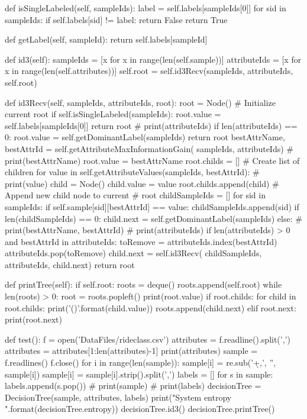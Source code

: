 \documentclass[%
oneside,                 %
final,                   %
10pt]{article}
\begin{document}
	def isSingleLabeled(self, sampleIds):
		label = self.labels[sampleIds[0]]
		for sid in sampleIds:
			if self.labels[sid] != label:
				return False
		return True

	def getLabel(self, sampleId):
		return self.labels[sampleId]

	def id3(self):
		sampleIds = [x for x in range(len(self.sample))]
		attributeIds = [x for x in range(len(self.attributes))]
		self.root = self.id3Recv(sampleIds, attributeIds, self.root)

	def id3Recv(self, sampleIds, attributeIds, root):
		root = Node() # Initialize current root
		if self.isSingleLabeled(sampleIds):
			root.value = self.labels[sampleIds[0]]
			return root
		# print(attributeIds)
		if len(attributeIds) == 0:
			root.value = self.getDominantLabel(sampleIds)
			return root
		bestAttrName, bestAttrId = self.getAttributeMaxInformationGain(
			sampleIds, attributeIds)
		# print(bestAttrName)
		root.value = bestAttrName
		root.childs = []  # Create list of children
		for value in self.getAttributeValues(sampleIds, bestAttrId):
			# print(value)
			child = Node()
			child.value = value
			root.childs.append(child)  # Append new child node to current
									   # root
			childSampleIds = []
			for sid in sampleIds:
				if self.sample[sid][bestAttrId] == value:
					childSampleIds.append(sid)
			if len(childSampleIds) == 0:
				child.next = self.getDominantLabel(sampleIds)
			else:
				# print(bestAttrName, bestAttrId)
				# print(attributeIds)
				if len(attributeIds) > 0 and bestAttrId in attributeIds:
					toRemove = attributeIds.index(bestAttrId)
					attributeIds.pop(toRemove)
				child.next = self.id3Recv(
					childSampleIds, attributeIds, child.next)
		return root

	def printTree(self):
		if self.root:
			roots = deque()
			roots.append(self.root)
			while len(roots) > 0:
				root = roots.popleft()
				print(root.value)
				if root.childs:
					for child in root.childs:
						print('({})'.format(child.value))
						roots.append(child.next)
				elif root.next:
					print(root.next)


def test():
	f = open('DataFiles/rideclass.csv')
	attributes = f.readline().split(',')
	attributes = attributes[1:len(attributes)-1]
	print(attributes)
	sample = f.readlines()
	f.close()
	for i in range(len(sample)):
		sample[i] = re.sub('\d+,', '', sample[i])
		sample[i] = sample[i].strip().split(',')
	labels = []
	for s in sample:
		labels.append(s.pop())
	# print(sample)
	# print(labels)
	decisionTree = DecisionTree(sample, attributes, labels)
	print("System entropy {}".format(decisionTree.entropy))
	decisionTree.id3()
	decisionTree.printTree()
\end{document}
